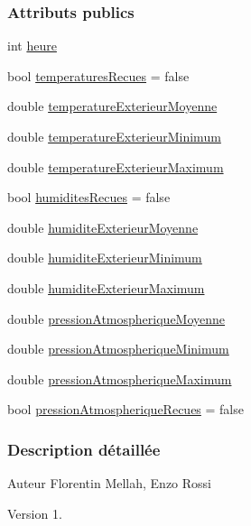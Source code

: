 \subsubsection*{Attributs publics}
\begin{DoxyCompactItemize}
\item 
int \hyperlink{struct_mesure_horaire_environement_a83295c95940d9edae2d082a94f49e1c9}{heure}
\item 
bool \hyperlink{struct_mesure_horaire_environement_a3444440b836c4893e8d61c3eb5c3e42d}{temperatures\+Recues} = false
\item 
double \hyperlink{struct_mesure_horaire_environement_a40be086e9b2454c0e70066a523a1b066}{temperature\+Exterieur\+Moyenne}
\item 
double \hyperlink{struct_mesure_horaire_environement_ae9737a62128ecf2614901ebe0b118548}{temperature\+Exterieur\+Minimum}
\item 
double \hyperlink{struct_mesure_horaire_environement_aaf73ec5bb5a7c8235c56dc4ea3c4d89c}{temperature\+Exterieur\+Maximum}
\item 
bool \hyperlink{struct_mesure_horaire_environement_a4348771984d70b9ea7867dba511db336}{humidites\+Recues} = false
\item 
double \hyperlink{struct_mesure_horaire_environement_a25909e0885ee3588c637b738ced303d7}{humidite\+Exterieur\+Moyenne}
\item 
double \hyperlink{struct_mesure_horaire_environement_a1621bd692dc352708d1931a48df9a596}{humidite\+Exterieur\+Minimum}
\item 
double \hyperlink{struct_mesure_horaire_environement_abb2c00c4262837d9e1122573283d86ec}{humidite\+Exterieur\+Maximum}
\item 
double \hyperlink{struct_mesure_horaire_environement_a6ae12cb9b6ac6a46f7c08e60049c7b72}{pression\+Atmospherique\+Moyenne}
\item 
double \hyperlink{struct_mesure_horaire_environement_a3d42b48772717461f7395cdae5ff925f}{pression\+Atmospherique\+Minimum}
\item 
double \hyperlink{struct_mesure_horaire_environement_a9b82da49ea52c6f118f25433a16e22d4}{pression\+Atmospherique\+Maximum}
\item 
bool \hyperlink{struct_mesure_horaire_environement_a5db5e56af7d297b500912489126f7305}{pression\+Atmospherique\+Recues} = false
\end{DoxyCompactItemize}


\subsubsection{Description détaillée}
\begin{DoxyAuthor}{Auteur}
Florentin Mellah, Enzo Rossi
\end{DoxyAuthor}
\begin{DoxyVersion}{Version}
1. 
\end{DoxyVersion}


